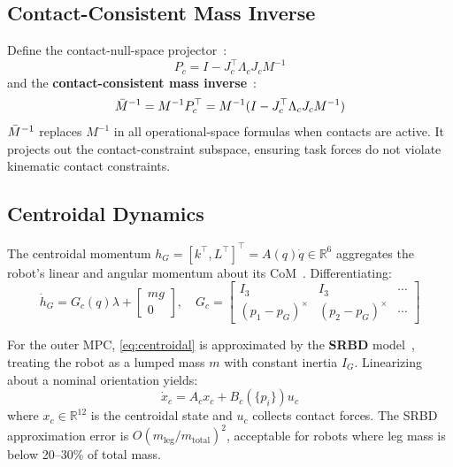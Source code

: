 \subsection{Contact-Consistent Mass Inverse}

Define the contact-null-space projector~\cite{khatib1987unified,righetti2011inverse}:
\begin{equation}\label{eq:Pc}
  P_c = I - J_c^\top\Lambda_c J_c M^{-1}
\end{equation}
and the \textbf{contact-consistent mass
inverse}~\cite{khatib1987unified,righetti2011inverse}:
\begin{equation}\label{eq:Mbar}
  \bar{M}^{-1} = M^{-1}P_c^\top = M^{-1}(I-J_c^\top\Lambda_cJ_cM^{-1})
\end{equation}
$\bar{M}^{-1}$ replaces $M^{-1}$ in all operational-space formulas when contacts
are active. It projects out the contact-constraint subspace, ensuring task
forces do not violate kinematic contact constraints.

\subsection{Centroidal Dynamics}

The centroidal momentum $h_G=[k^\top,L^\top]^\top=A(q)\dot{q}\in\mathbb{R}^6$
aggregates the robot's linear and angular momentum about its
CoM~\cite{orin2013centroidal}. Differentiating:
\begin{equation}\label{eq:centroidal}
  \dot{h}_G = G_c(q)\lambda + \begin{bmatrix}mg \\ 0\end{bmatrix},
  \quad
  G_c = \begin{bmatrix}I_3 & I_3 & \cdots \\
                       (p_1{-}p_G)^\times & (p_2{-}p_G)^\times & \cdots\end{bmatrix}
\end{equation}

For the outer MPC, \eqref{eq:centroidal} is approximated by the
\textbf{SRBD} model~\cite{dicarlo2018dynamic}, treating the robot as a
lumped mass $m$ with constant inertia $I_G$. Linearizing about a nominal
orientation yields:
\begin{equation}\label{eq:SRBD}
  \dot{x}_c = A_c x_c + B_c(\{p_i\})u_c
\end{equation}
where $x_c\in\mathbb{R}^{12}$ is the centroidal state and $u_c$ collects
contact forces. The SRBD approximation error is
$O(m_{\text{leg}}/m_{\text{total}})^2$, acceptable for robots where leg
mass is below 20--30\% of total mass.

